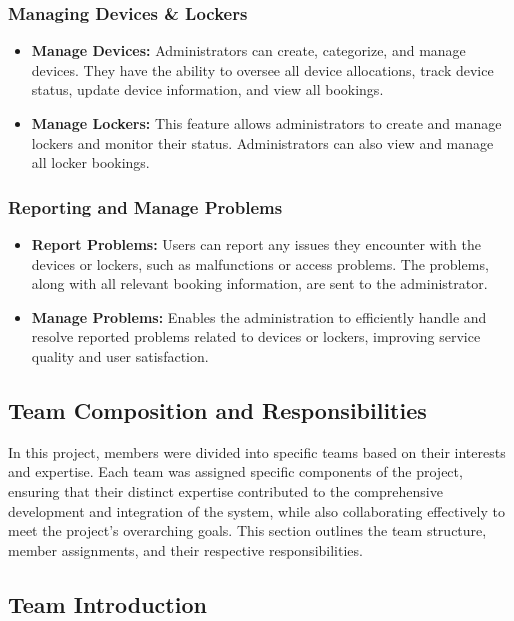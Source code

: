 \subsubsection{Managing Devices \& Lockers}
\begin{itemize}
\item \textbf{Manage Devices:} Administrators can create, categorize, and manage devices. They have the ability to oversee all device allocations, track device status, update device information, and view all bookings.

\item \textbf{Manage Lockers:} This feature allows administrators to create and manage lockers and monitor their status. Administrators can also view and manage all locker bookings.
\end{itemize}

\subsubsection{Reporting and Manage Problems}
\begin{itemize}

\item \textbf{Report Problems: }Users can report any issues they encounter with the devices or lockers, such as malfunctions or access problems. The problems, along with all relevant booking information, are sent to the administrator.

\item \textbf{Manage Problems: }Enables the administration to efficiently handle and resolve reported problems related to devices or lockers, improving service quality and user satisfaction.
\end{itemize}


\subsection{Team Composition and Responsibilities}
In this project, members were divided into specific teams based on their interests and expertise. Each team was assigned specific components of the project, ensuring that their distinct expertise contributed to the comprehensive development and integration of the system, while also collaborating effectively to meet the project's overarching goals. This section outlines the team structure, member assignments, and their respective responsibilities. 
\newpage
\subsection{Team Introduction}
